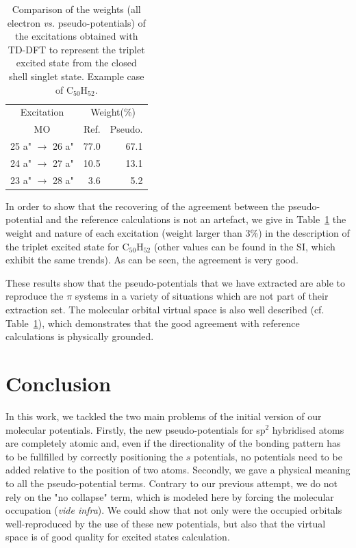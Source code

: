 \documentclass[aip]{revtex4-1}
\begin{document}
\begin{table}[ht]
\begin{tabular}{c c r r}
\hline\hline
\multicolumn{2}{c}{Excitation} & \multicolumn{2}{c}{Weight(\%)}\\
\multicolumn{2}{c}{MO} & Ref. & Pseudo.\\
\hline
\multicolumn{2}{c}{25 a" \(\rightarrow\) 26 a"} & 77.0 &   67.1  \\
\multicolumn{2}{c}{24 a" \(\rightarrow\) 27 a"} & 10.5 &   13.1  \\
\multicolumn{2}{c}{23 a" \(\rightarrow\) 28 a"} & 3.6  &    5.2  \\
\hline\hline
\end{tabular}
\caption{\label{tab:coef}Comparison of the weights (all electron \emph{vs.} pseudo-potentials)
of the excitations obtained with TD-DFT
to represent the triplet excited state from the closed shell singlet state.
Example case of C$_{50}$H$_{52}$.}
\end{table}

In order to show that the recovering of the agreement between the pseudo-potential
and the reference calculations is not an artefact, we give in Table~\ref{tab:coef}
the weight and nature of each excitation (weight larger than 3\%)
in the description of the triplet excited state for
C$_{50}$H$_{52}$ (other values can be found in the SI, which exhibit the same trends).
As can be seen, the agreement is very good. 

These results show that the pseudo-potentials that we have extracted are able to reproduce the
$\pi$ systems in a variety of situations which are not part of their extraction set.
The molecular orbital virtual space is also well described (cf. Table~\ref{tab:coef}),
which demonstrates that the good agreement with reference calculations is
physically grounded.

\clearpage

\section{Conclusion}
In this work, we tackled the two main problems of the initial version of our
molecular potentials.
Firstly, the new pseudo-potentials for sp$^2$ hybridised
atoms are completely atomic and, even if the directionality of the bonding pattern
has to be fullfilled by correctly positioning the \(s\) potentials, no potentials need to
be added relative to the position of two atoms.
Secondly, we gave a physical meaning to all the pseudo-potential
terms.
Contrary to our previous attempt, we do not rely on the "no collapse" term,
which is modeled here by forcing the molecular occupation (\emph{vide infra}).
We could show that not only were the occupied orbitals well-reproduced
by the use of these new potentials, but also that the virtual space is of good quality
for excited states calculation.
\end{document}
